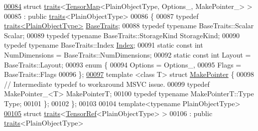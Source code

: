 \begin{DoxyCode}
\hyperlink{struct_eigen_1_1internal_1_1traits_3_01_tensor_map_3_01_plain_object_type_00_01_options___00_01_make_pointer___01_4_01_4}{00084} \textcolor{keyword}{struct }\hyperlink{struct_eigen_1_1internal_1_1traits}{traits}<\hyperlink{class_eigen_1_1_tensor_map}{TensorMap}<PlainObjectType, Options\_, MakePointer\_> >
00085   : \textcolor{keyword}{public} \hyperlink{struct_eigen_1_1internal_1_1traits}{traits}<PlainObjectType>
00086 \{
00087   \textcolor{keyword}{typedef} \hyperlink{struct_eigen_1_1internal_1_1traits}{traits<PlainObjectType>} \hyperlink{struct_eigen_1_1internal_1_1traits}{BaseTraits};
00088   \textcolor{keyword}{typedef} \textcolor{keyword}{typename} BaseTraits::Scalar Scalar;
00089   \textcolor{keyword}{typedef} \textcolor{keyword}{typename} BaseTraits::StorageKind StorageKind;
00090   \textcolor{keyword}{typedef} \textcolor{keyword}{typename} BaseTraits::Index \hyperlink{namespace_eigen_a62e77e0933482dafde8fe197d9a2cfde}{Index};
00091   \textcolor{keyword}{static} \textcolor{keyword}{const} \textcolor{keywordtype}{int} NumDimensions = BaseTraits::NumDimensions;
00092   \textcolor{keyword}{static} \textcolor{keyword}{const} \textcolor{keywordtype}{int} Layout = BaseTraits::Layout;
00093   \textcolor{keyword}{enum} \{
00094     Options = Options\_,
00095     Flags = BaseTraits::Flags
00096   \};
\hyperlink{struct_eigen_1_1internal_1_1traits_3_01_tensor_map_3_01_plain_object_type_00_01_options___00_01_2ffe711dc868f2af95478b5bf448510f}{00097}   \textcolor{keyword}{template} <\textcolor{keyword}{class} T> \textcolor{keyword}{struct }\hyperlink{struct_eigen_1_1_make_pointer}{MakePointer} \{
00098     \textcolor{comment}{// Intermediate typedef to workaround MSVC issue.}
00099     \textcolor{keyword}{typedef} MakePointer\_<T> MakePointerT;
00100     \textcolor{keyword}{typedef} \textcolor{keyword}{typename} MakePointerT::Type Type;
00101   \};
00102 \};
00103 
00104 \textcolor{keyword}{template}<\textcolor{keyword}{typename} PlainObjectType>
\hyperlink{struct_eigen_1_1internal_1_1traits_3_01_tensor_ref_3_01_plain_object_type_01_4_01_4}{00105} \textcolor{keyword}{struct }\hyperlink{struct_eigen_1_1internal_1_1traits}{traits}<\hyperlink{class_eigen_1_1_tensor_ref}{TensorRef}<PlainObjectType> >
00106   : \textcolor{keyword}{public} \hyperlink{struct_eigen_1_1internal_1_1traits}{traits}<PlainObjectType>

\end{DoxyCode}
